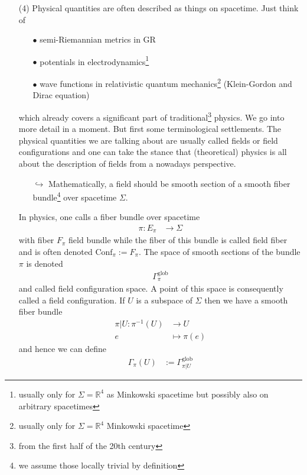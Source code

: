 \begin{enumerate}
\item[(4)]
Physical quantities are often described as things on spacetime. Just think of
\begin{enumerate}
\item[$\bullet$]
semi-Riemannian metrics in GR
\item[$\bullet$]
potentials in electrodynamics\footnote{usually only for $\Sigma = \mathbb{R}^{4}$ as Minkowski spacetime but possibly also on arbitrary spacetimes}
\item[$\bullet$]
wave functions in relativistic quantum mechanics\footnote{usually only for $\Sigma = \mathbb{R}^{4}$ Minkowski spacetime} (Klein-Gordon and Dirac equation)
\end{enumerate}
which already covers a significant part of traditional\footnote{from the first half of the 20th century} physics. We go into more detail in a moment. But first some terminological settlements. The physical quantities we are talking about are usually called fields or field configurations and one can take the stance that (theoretical) physics is all about the description of fields from a nowadays perspective.
\begin{enumerate}
\item[$\pmb{\hookrightarrow}$]
Mathematically, a field should be smooth section of a smooth fiber bundle\footnote{we assume those locally trivial by definition} over spacetime $\Sigma$.
\end{enumerate}
In physics, one calls a fiber bundle over spacetime
\begin{align*}
  \pi
  \colon
  E_{\pi}
  &\rightarrow
  \Sigma
\end{align*}
with fiber $F_{\pi}$ field bundle while the fiber of this bundle is called field fiber and is often denoted $\mathrm{Conf}_{\pi} := F_{\pi}$. The space of smooth sections of the bundle $\pi$ is denoted
\begin{align*}
  \Gamma_{\pi}^{\mathrm{glob}}
\end{align*}
and called field configuration space. A point of this space is consequently called a field configuration. If $U$ is a subspace of $\Sigma$ then we have a smooth fiber bundle
\begin{align*}
  \pi
  \vert
  U
  \colon
  \pi^{-1}(U)
  &\rightarrow
  U
  \\
  e
  &\mapsto
  \pi(e)
\end{align*}
and hence we can define
\begin{align*}
  \Gamma_{\pi}(U)
  &:=
  \Gamma_{\pi \vert U}^{\mathrm{glob}}

\end{align*}
\end{enumerate}
